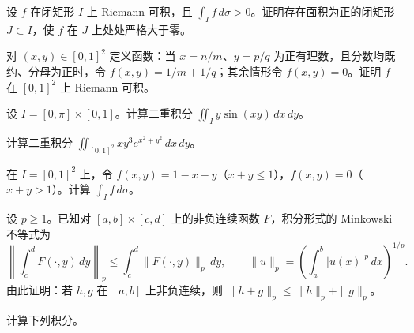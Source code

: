 \noindent\begin{minipage}{\textwidth}
设 $f$ 在闭矩形 $I$ 上 Riemann 可积，且 $\int_I f\,d\sigma>0$。证明存在面积为正的闭矩形 $J\subset I$，使 $f$ 在 $J$ 上处处严格大于零。
\end{minipage}\par\vfill
\noindent\begin{minipage}{\textwidth}
对 $(x,y)\in[0,1]^2$ 定义函数：当 $x=n/m$、$y=p/q$ 为正有理数，且分数均既约、分母为正时，令 $f(x,y)=1/m+1/q$；其余情形令 $f(x,y)=0$。证明 $f$ 在 $[0,1]^2$ 上 Riemann 可积。
\end{minipage}\par\vfill
\newpage
\noindent\begin{minipage}{\textwidth}
设 $I=[0,\pi]\times[0,1]$。计算二重积分 $\iint_I y\sin(xy)\,dx\,dy$。
\end{minipage}\par\vfill
\noindent\begin{minipage}{\textwidth}
计算二重积分 $\displaystyle\iint_{[0,1]^2}xy^3e^{x^2+y^2}\,dx\,dy$。
\end{minipage}\par\vfill
\noindent\begin{minipage}{\textwidth}
在 $I=[0,1]^2$ 上，令 $f(x,y)=1-x-y$（$x+y\le1$），$f(x,y)=0$（$x+y>1$）。计算 $\int_I f\,d\sigma$。
\end{minipage}\par\vfill
\newpage
\noindent\begin{minipage}{\textwidth}
设 $p\ge1$。已知对 $[a,b]\times[c,d]$ 上的非负连续函数 $F$，积分形式的 Minkowski 不等式为\[\left\|\int_c^d F(\cdot,y)\,dy\right\|_p\le \int_c^d \big\|F(\cdot,y)\big\|_p\,dy,\qquad \|u\|_p=\left(\int_a^b |u(x)|^p\,dx\right)^{1/p}.\]由此证明：若 $h,g$ 在 $[a,b]$ 上非负连续，则 $\|h+g\|_p\le \|h\|_p+\|g\|_p$。
\end{minipage}\par\vfill
\noindent\begin{minipage}{\textwidth}
计算下列积分。
\end{minipage}\par\vfill
